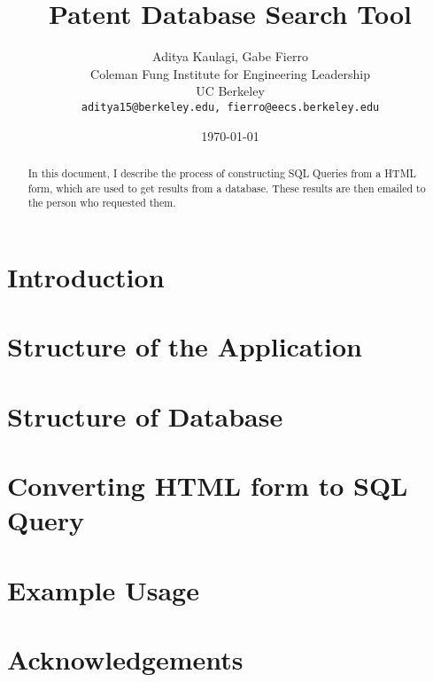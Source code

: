 \documentclass[11pt, twocolumn]{article}
\begin{document}
\title{Patent Database Search Tool}
\author{Aditya Kaulagi, Gabe Fierro\\
	Coleman Fung Institute for Engineering Leadership\\
	UC Berkeley\\
	\texttt{aditya15@berkeley.edu, fierro@eecs.berkeley.edu}}
\date{\today}
\maketitle

\begin{abstract}
In this document, I describe the process of constructing SQL Queries from a HTML form, which are used to get results from a database. These results are then emailed to the person who requested them.
\end{abstract}

\section{Introduction}

\section{Structure of the Application}

\section{Structure of Database}

\section{Converting HTML form to SQL Query}

\section{Example Usage}

\section{Acknowledgements}


\newpage
{
\scriptsize


}
\end{document}
